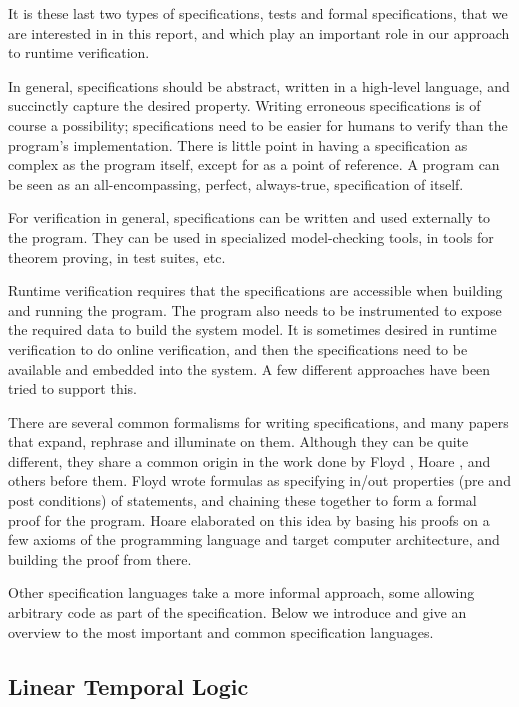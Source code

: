 It is these last two types of specifications, tests and formal specifications,
that we are interested in in this report, and which play an important role in
our approach to runtime verification.

In general, specifications should be abstract, written in a high-level
language, and succinctly capture the desired property. Writing erroneous
specifications is of course a possibility; specifications need to be easier for
humans to verify than the program's implementation. There is little point in
having a specification as complex as the program itself, except for as a point
of reference. A program can be seen as an all-encompassing, perfect,
always-true, specification of itself.

For verification in general, specifications can be written and used externally
to the program. They can be used in specialized model-checking tools, in tools
for theorem proving, in test suites, etc.

Runtime verification requires that the specifications are accessible when
building and running the program. The program also  needs to be instrumented to 
expose the required data to build the system model. It is sometimes desired in
runtime verification to do online verification, and then the specifications
need to be available and embedded into the system. A few different approaches
have been tried to support this.

There are several common formalisms for writing specifications, and many papers
that expand, rephrase and illuminate on them. Although they can be quite
different, they share a common origin in the work done by Floyd \cite{floyd67},
Hoare \cite{hoare69}, and others before them. Floyd wrote formulas as
specifying in/out properties (pre and post conditions) of statements, and
chaining these together to form a formal proof for the program. Hoare
elaborated on this idea by basing his proofs on a few axioms of the programming
language and target computer architecture, and building the proof from there.

Other specification languages take a more informal approach, some allowing
arbitrary code as part of the specification. Below we introduce and give an
overview to the most important and common specification languages.


\subsection{Linear Temporal Logic} \label{section-ltl}

